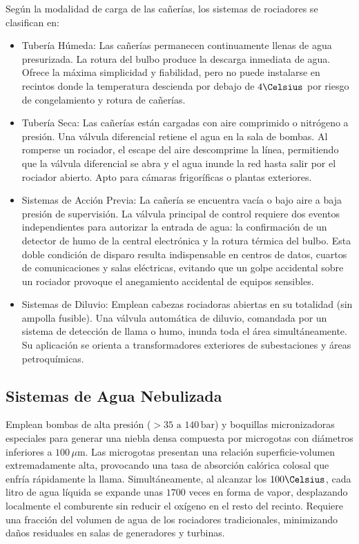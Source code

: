 Según la modalidad de carga de las cañerías, los sistemas de rociadores se clasifican en:
\begin{itemize}
    \item Tubería Húmeda: Las cañerías permanecen continuamente llenas de agua presurizada. La rotura
          del bulbo produce la descarga inmediata de agua. Ofrece la máxima simplicidad y fiabilidad, pero no puede
          instalarse en recintos donde la temperatura descienda por debajo de $4\Celsius$ por riesgo de congelamiento y
          rotura de cañerías.
    \item Tubería Seca: Las cañerías están cargadas con aire comprimido o nitrógeno a presión. Una
          válvula diferencial retiene el agua en la sala de bombas. Al romperse un rociador, el escape del aire descomprime la
          línea, permitiendo que la válvula diferencial se abra y el agua inunde la red hasta salir por el rociador abierto.
          Apto para cámaras frigoríficas o plantas exteriores.
    \item Sistemas de Acción Previa: La cañería se encuentra vacía o bajo aire a baja presión de
          supervisión. La válvula principal de control requiere dos eventos independientes para autorizar la entrada de agua:
          la confirmación de un detector de humo de la central electrónica y la rotura térmica del bulbo. Esta doble
          condición de disparo resulta indispensable en centros de datos, cuartos de comunicaciones y salas eléctricas,
          evitando que un golpe accidental sobre un rociador provoque el anegamiento accidental de equipos sensibles.
    \item Sistemas de Diluvio: Emplean cabezas rociadoras abiertas en su totalidad (sin ampolla fusible).
          Una válvula automática de diluvio, comandada por un sistema de detección de llama o humo, inunda toda el área
          simultáneamente. Su aplicación se orienta a transformadores exteriores de subestaciones y áreas petroquímicas.
\end{itemize}

\subsection{Sistemas de Agua Nebulizada}

Emplean bombas de alta presión ($> 35\text{ a }140\,\mathrm{bar}$) y boquillas micronizadoras especiales para generar una
niebla densa compuesta por microgotas con diámetros inferiores a $100\,\mu\mathrm{m}$. Las microgotas presentan una relación
superficie-volumen extremadamente alta, provocando una tasa de absorción calórica colosal que enfría rápidamente la llama.
Simultáneamente, al alcanzar los $100\Celsius$, cada litro de agua líquida se expande unas $1700$ veces en forma de vapor,
desplazando localmente el comburente sin reducir el oxígeno en el resto del recinto. Requiere una fracción del volumen de
agua de los rociadores tradicionales, minimizando daños residuales en salas de generadores y turbinas.

